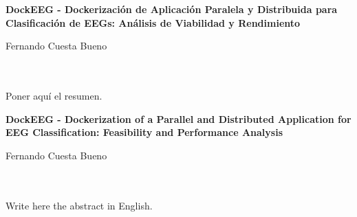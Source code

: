 \chapter*{}






\cleardoublepage
\thispagestyle{empty}

\begin{center}
       {\large\bfseries DockEEG - Dockerización de Aplicación Paralela y Distribuida para Clasificación de EEGs: Análisis de Viabilidad y Rendimiento}\\
\end{center}
\begin{center}
       Fernando Cuesta Bueno\\
\end{center}

\\

\vspace{0.7cm}
\\

Poner aquí el resumen.
\cleardoublepage


\thispagestyle{empty}


\begin{center}
       {\large\bfseries DockEEG - Dockerization of a Parallel and Distributed Application for EEG Classification: Feasibility and Performance Analysis}\\
\end{center}
\begin{center}
       Fernando Cuesta Bueno\\
\end{center}

\\

\vspace{0.7cm}
\\

Write here the abstract in English.

\chapter*{}
\thispagestyle{empty}

